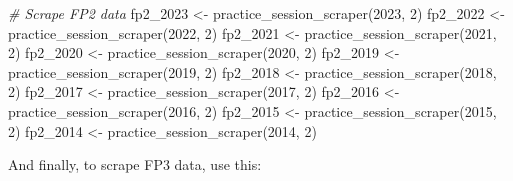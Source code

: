 \documentclass[
]{book}
\newenvironment{Shaded}{\begin{snugshade}}{\end{snugshade}}
\newcommand{\CommentTok}[1]{\textcolor[rgb]{0.56,0.35,0.01}{\textit{#1}}}
\newcommand{\DecValTok}[1]{\textcolor[rgb]{0.00,0.00,0.81}{#1}}
\newcommand{\FunctionTok}[1]{\textcolor[rgb]{0.00,0.00,0.00}{#1}}
\newcommand{\NormalTok}[1]{#1}
\newcommand{\OtherTok}[1]{\textcolor[rgb]{0.56,0.35,0.01}{#1}}
\begin{document}
\begin{Shaded}
\begin{Highlighting}[]
\CommentTok{\# Scrape FP2 data}
\NormalTok{fp2\_2023 }\OtherTok{\textless{}{-}} \FunctionTok{practice\_session\_scraper}\NormalTok{(}\DecValTok{2023}\NormalTok{, }\DecValTok{2}\NormalTok{)}
\NormalTok{fp2\_2022 }\OtherTok{\textless{}{-}} \FunctionTok{practice\_session\_scraper}\NormalTok{(}\DecValTok{2022}\NormalTok{, }\DecValTok{2}\NormalTok{)}
\NormalTok{fp2\_2021 }\OtherTok{\textless{}{-}} \FunctionTok{practice\_session\_scraper}\NormalTok{(}\DecValTok{2021}\NormalTok{, }\DecValTok{2}\NormalTok{)}
\NormalTok{fp2\_2020 }\OtherTok{\textless{}{-}} \FunctionTok{practice\_session\_scraper}\NormalTok{(}\DecValTok{2020}\NormalTok{, }\DecValTok{2}\NormalTok{)}
\NormalTok{fp2\_2019 }\OtherTok{\textless{}{-}} \FunctionTok{practice\_session\_scraper}\NormalTok{(}\DecValTok{2019}\NormalTok{, }\DecValTok{2}\NormalTok{)}
\NormalTok{fp2\_2018 }\OtherTok{\textless{}{-}} \FunctionTok{practice\_session\_scraper}\NormalTok{(}\DecValTok{2018}\NormalTok{, }\DecValTok{2}\NormalTok{)}
\NormalTok{fp2\_2017 }\OtherTok{\textless{}{-}} \FunctionTok{practice\_session\_scraper}\NormalTok{(}\DecValTok{2017}\NormalTok{, }\DecValTok{2}\NormalTok{)}
\NormalTok{fp2\_2016 }\OtherTok{\textless{}{-}} \FunctionTok{practice\_session\_scraper}\NormalTok{(}\DecValTok{2016}\NormalTok{, }\DecValTok{2}\NormalTok{)}
\NormalTok{fp2\_2015 }\OtherTok{\textless{}{-}} \FunctionTok{practice\_session\_scraper}\NormalTok{(}\DecValTok{2015}\NormalTok{, }\DecValTok{2}\NormalTok{)}
\NormalTok{fp2\_2014 }\OtherTok{\textless{}{-}} \FunctionTok{practice\_session\_scraper}\NormalTok{(}\DecValTok{2014}\NormalTok{, }\DecValTok{2}\NormalTok{)}
\end{Highlighting}
\end{Shaded}

And finally, to scrape FP3 data, use this:
\end{document}

